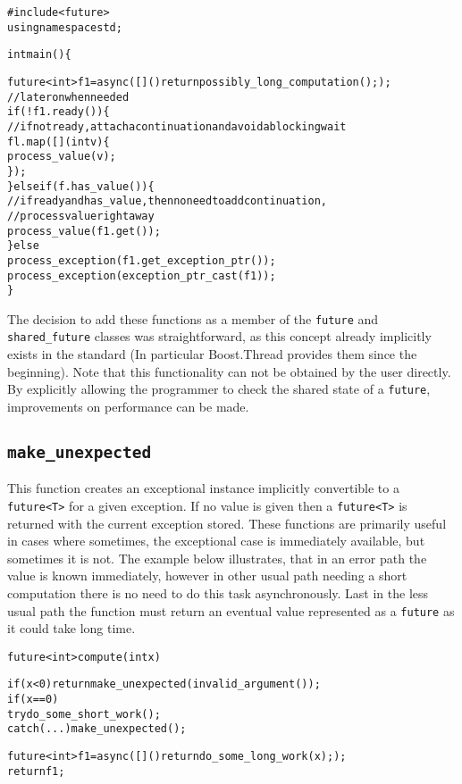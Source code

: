 \documentclass[a4paper,10pt]{article}
\newcommand{\cpp}[1]{\lstinline{#1}}
\newcommand{\suppress}[1]{\colorbox{suppress_color}{#1}}
\newcommand{\update}[1]{\colorbox{update_color}{#1}}
\begin{document}
\begin{alltt}
#include <future> 
using namespace std; 

int main() \{ 
 
  future<int> f1 = async([]() { return possibly_long_computation(); }); 
  // later on when needed 
  if(!f1.ready()) \{ 
    //if not ready, attach a continuation and avoid a blocking wait 
    fl.map([] (int v) \{ 
      process_value(v); 
    \}); 
  \} else if (f.has_value()) \{ 
  //if ready and has_value, then no need to add continuation, 
  // process value right away 
      process_value(f1.get()); 
  \} else
  \suppress{    process_exception(f1.get_exception_ptr()); }
  \update{    process_exception(exception_ptr_cast(f1)); }
\} 
\end{alltt}

The decision to add these functions as a member of the \cpp{future} and \cpp{shared_future} classes was straightforward, as this concept already implicitly exists in the standard (In particular Boost.Thread provides them since the beginning). Note that this functionality can not be obtained by the user directly. By explicitly allowing the programmer to check the shared state of a \cpp{future}, improvements on performance can be made.  
 
\subsection{\update{\cpp{make_unexpected}}}

This function creates an exceptional instance implicitly convertible to a \cpp{future<T>} for a given exception. If no value is given then a \cpp{future<T>} is returned with the current exception stored. These functions are primarily useful in cases where sometimes, the exceptional case is immediately available, but sometimes it is not. The example below illustrates, that in an error path the value is known immediately, however in other usual path needing a short computation there is no need to do this task asynchronously. Last in the  less usual path the function must return an eventual value represented as a \cpp{future} as it could take long time. 

\begin{alltt}
future<int> compute(int x) { 
 
  if (x < 0) return make_unexpected(invalid_argument());
  if (x == 0) 
    try { do_some_short_work(); } 
    catch (...) { make_unexpected(); }
 
  future<int> f1 = async([]() { return do_some_long_work(x); }); 
  return f1; 
}
\end{alltt}
\end{document}
